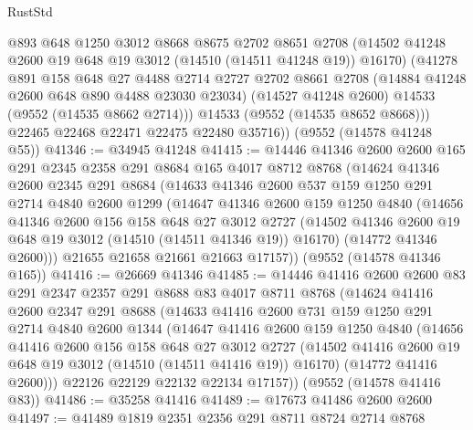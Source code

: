 \begin{lexlean}{RustStd}
\begin{coremodule}
          @893
          @648
          @1250
          @3012
          @8668
          @8675
          @2702
          @8651
          @2708
          (@14502 @41248 @2600 @19 @648 @19 @3012 (@14510 (@14511 @41248 @19)) @16170)
          (@41278
            @891
            @158
            @648
            @27
            @4488
            @2714
            @2727
            @2702
            @8661
            @2708
            (@14884 @41248 @2600 @648 @890 @4488 @23030 @23034)
            (@14527 @41248 @2600)
            @14533
            (@9552 (@14535 @8662 @2714)))
          @14533
          (@9552 (@14535 @8652 @8668)))
        @22465
        @22468
        @22471
        @22475
        @22480
        @35716))
    (@9552 (@14578 @41248 @55))
@41346 := @34945 @41248
@41415 := @14446
    @41346
    @2600
    @2600
    @165
    @291
    @2345
    @2358
    @291
    @8684
    @165
    @4017
    @8712
    @8768
    (@14624
      @41346
      @2600
      @2345
      @291
      @8684
      (@14633
        @41346
        @2600
        @537
        @159
        @1250
        @291
        @2714
        @4840
        @2600
        @1299
        (@14647
          @41346
          @2600
          @159
          @1250
          @4840
          (@14656
            @41346
            @2600
            @156
            @158
            @648
            @27
            @3012
            @2727
            (@14502 @41346 @2600 @19 @648 @19 @3012 (@14510 (@14511 @41346 @19)) @16170)
            (@14772 @41346 @2600)))
        @21655
        @21658
        @21661
        @21663
        @17157))
    (@9552 (@14578 @41346 @165))
@41416 := @26669 @41346
@41485 := @14446
    @41416
    @2600
    @2600
    @83
    @291
    @2347
    @2357
    @291
    @8688
    @83
    @4017
    @8711
    @8768
    (@14624
      @41416
      @2600
      @2347
      @291
      @8688
      (@14633
        @41416
        @2600
        @731
        @159
        @1250
        @291
        @2714
        @4840
        @2600
        @1344
        (@14647
          @41416
          @2600
          @159
          @1250
          @4840
          (@14656
            @41416
            @2600
            @156
            @158
            @648
            @27
            @3012
            @2727
            (@14502 @41416 @2600 @19 @648 @19 @3012 (@14510 (@14511 @41416 @19)) @16170)
            (@14772 @41416 @2600)))
        @22126
        @22129
        @22132
        @22134
        @17157))
    (@9552 (@14578 @41416 @83))
@41486 := @35258 @41416
@41489 := @17673 @41486 @2600 @2600
@41497 := @41489 @1819 @2351 @2356 @291 @8711 @8724 @2714 @8768

\end{coremodule}
\end{lexlean}
